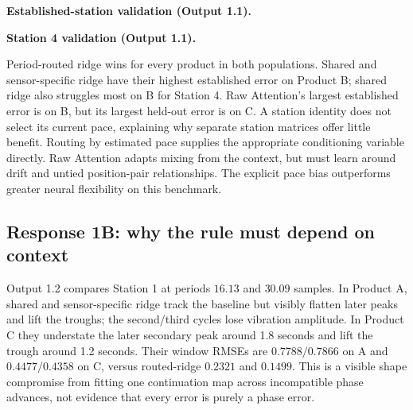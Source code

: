 \documentclass[10pt]{article}
\begin{document}
\textbf{Established-station validation (Output 1.1).}
\begin{center}\end{center}
\textbf{Station 4 validation (Output 1.1).}
\begin{center}\end{center}
Period-routed ridge wins for every product in both populations. Shared and sensor-specific ridge have their highest established error on Product B; shared ridge also struggles most on B for Station 4. Raw Attention's largest established error is on B, but its largest held-out error is on C. A station identity does not select its current pace, explaining why separate station matrices offer little benefit. Routing by estimated pace supplies the appropriate conditioning variable directly. Raw Attention adapts mixing from the context, but must learn around drift and untied position-pair relationships. The explicit pace bias outperforms greater neural flexibility on this benchmark.

\subsection*{Response 1B: why the rule must depend on context}
Output 1.2 compares Station 1 at periods $16.13$ and $30.09$ samples. In Product A, shared and sensor-specific ridge track the baseline but visibly flatten later peaks and lift the troughs; the second/third cycles lose vibration amplitude. In Product C they understate the later secondary peak around 1.8 seconds and lift the trough around 1.2 seconds. Their window RMSEs are $0.7788/0.7866$ on A and $0.4477/0.4358$ on C, versus routed-ridge $0.2321$ and $0.1499$. This is a visible shape compromise from fitting one continuation map across incompatible phase advances, not evidence that every error is purely a phase error.
\end{document}
